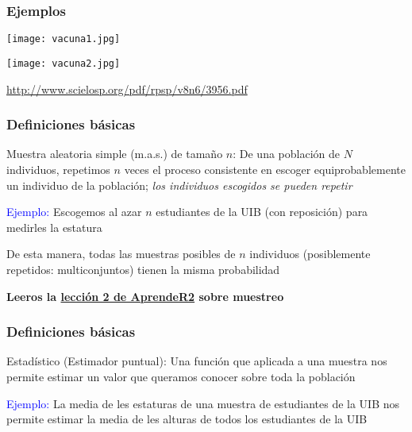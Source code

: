 \documentclass[12pt,t]{beamer}
\newcommand{\blue}[1]{\textcolor{blue}{#1}}
\renewcommand{\emph}[1]{{\color{red}#1}}
\theoremstyle{plain}
\theoremstyle{definition}
\begin{document}
%
%

\begin{frame}
\frametitle{Ejemplos}


\begin{center}
\texttt{[image: vacuna1.jpg]}\medskip

\texttt{[image: vacuna2.jpg]}
\end{center}


{\footnotesize \url{http://www.scielosp.org/pdf/rpsp/v8n6/3956.pdf}}
\end{frame}

\begin{frame}
\frametitle{Definiciones básicas}

\emph{Muestra aleatoria simple (m.a.s.) de tamaño $n$:} De una población de $N$ individuos, repetimos $n$ veces el proceso   consistente en escoger equiprobablemente un individuo de la población; \textit{los individuos escogidos se pueden repetir}
\bigskip

\blue{Ejemplo:} Escogemos  al azar $n$ estudiantes de la UIB (con reposición) para medirles la estatura
\bigskip

De esta manera, todas las muestras posibles de $n$ individuos (posiblemente repetidos: \emph{multiconjuntos}) tienen la misma probabilidad
\bigskip

\emph{\bf Leeros la \href{https://aprender-uib.github.io/AprendeR2/chap-muestreo.html}{lección 2 de AprendeR2} sobre muestreo}
\end{frame}


\begin{frame}
\frametitle{Definiciones básicas}

\emph{Estadístico} (\emph{Estimador puntual}): Una función que aplicada a una muestra nos permite \emph{estimar} un valor que queramos conocer sobre  toda la población
\bigskip

\blue{Ejemplo:} La media de les estaturas  de una muestra de estudiantes de la UIB nos permite estimar la media de les alturas de todos los   estudiantes de la UIB
\bigskip

\end{frame}
\end{document}
